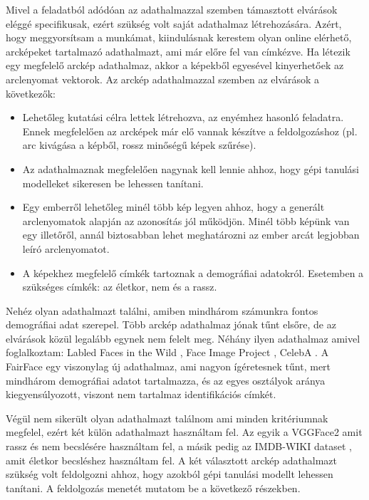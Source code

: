 Mivel a feladatból adódóan az adathalmazzal szemben támasztott elvárások eléggé specifikusak, ezért szükség volt saját adathalmaz létrehozására. Azért, hogy meggyorsítsam a munkámat, kiindulásnak kerestem olyan online elérhető, arcképeket tartalmazó adathalmazt, ami már előre fel van címkézve. Ha létezik egy megfelelő arckép adathalmaz, akkor a képekből egyesével kinyerhetőek az arclenyomat vektorok. Az arckép adathalmazzal szemben az elvárások a következők:
\begin{itemize}
	\item Lehetőleg kutatási célra lettek létrehozva, az enyémhez hasonló feladatra. Ennek megfelelően az arcképek már elő vannak készítve a feldolgozáshoz (pl. arc kivágása a képből, rossz minőségű képek szűrése).
	\item Az adathalmaznak megfelelően nagynak kell lennie ahhoz, hogy gépi tanulási modelleket sikeresen be lehessen tanítani.
	\item Egy emberről lehetőleg minél több kép legyen ahhoz, hogy a generált arclenyomatok alapján az azonosítás jól működjön. Minél több képünk van egy illetőről, annál biztosabban lehet meghatározni az ember arcát legjobban leíró arclenyomatot.
	\item A képekhez megfelelő címkék tartoznak a demográfiai adatokról. Esetemben a szükséges címkék: az életkor, nem és a rassz.
\end{itemize}

Nehéz olyan adathalmazt találni, amiben mindhárom számunkra fontos demográfiai adat szerepel. Több arckép adathalmaz jónak tűnt elsőre, de az elvárások közül legalább egynek nem felelt meg. Néhány ilyen adathalmaz amivel foglalkoztam: Labled Faces in the Wild \cite{labledfacesinthewild2008}, Face Image Project \cite{faceimageproject2014}, CelebA \cite{celebA2015}. A FairFace \cite{fairface2021} egy viszonylag új adathalmaz, ami nagyon ígéretesnek tűnt, mert mindhárom demográfiai adatot tartalmazza, és az egyes osztályok aránya kiegyensúlyozott, viszont nem tartalmaz identifikációs címkét.

Végül nem sikerült olyan adathalmazt találnom ami minden kritériumnak megfelel, ezért két külön adathalmazt használtam fel. Az egyik a VGGFace2 \cite{vggface22018} amit rassz és nem becslésére használtam fel, a másik pedig az IMDB-WIKI dataset \cite{imdbwiki2018}, amit életkor becsléshez használtam fel. A két választott arckép adathalmazt szükség volt feldolgozni ahhoz, hogy azokból gépi tanulási modellt lehessen tanítani. A feldolgozás menetét mutatom be a következő részekben.

